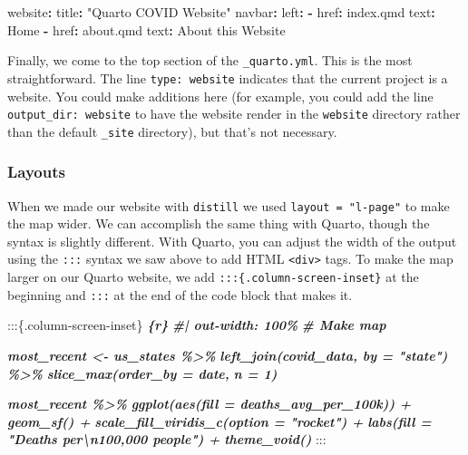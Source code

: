 \documentclass[
]{book}
\newenvironment{Shaded}{\begin{snugshade}}{\end{snugshade}}
\newcommand{\AttributeTok}[1]{\textcolor[rgb]{0.77,0.63,0.00}{#1}}
\newcommand{\FunctionTok}[1]{\textcolor[rgb]{0.00,0.00,0.00}{#1}}
\newcommand{\InformationTok}[1]{\textcolor[rgb]{0.56,0.35,0.01}{\textbf{\textit{#1}}}}
\newcommand{\KeywordTok}[1]{\textcolor[rgb]{0.13,0.29,0.53}{\textbf{#1}}}
\newcommand{\NormalTok}[1]{#1}
\newcommand{\StringTok}[1]{\textcolor[rgb]{0.31,0.60,0.02}{#1}}
\begin{document}
\begin{Shaded}
\begin{Highlighting}[]
\FunctionTok{website}\KeywordTok{:}
\AttributeTok{  }\FunctionTok{title}\KeywordTok{:}\AttributeTok{ }\StringTok{"Quarto COVID Website"}
\AttributeTok{  }\FunctionTok{navbar}\KeywordTok{:}
\AttributeTok{    }\FunctionTok{left}\KeywordTok{:}
\AttributeTok{      }\KeywordTok{{-}}\AttributeTok{ }\FunctionTok{href}\KeywordTok{:}\AttributeTok{ index.qmd}
\AttributeTok{        }\FunctionTok{text}\KeywordTok{:}\AttributeTok{ Home}
\AttributeTok{      }\KeywordTok{{-}}\AttributeTok{ }\FunctionTok{href}\KeywordTok{:}\AttributeTok{ about.qmd}
\AttributeTok{        }\FunctionTok{text}\KeywordTok{:}\AttributeTok{ About this Website}
\end{Highlighting}
\end{Shaded}

Finally, we come to the top section of the \texttt{\_quarto.yml}. This is the most straightforward. The line \texttt{type:\ website} indicates that the current project is a website. You could make additions here (for example, you could add the line \texttt{output\_dir:\ website} to have the website render in the \texttt{website} directory rather than the default \texttt{\_site} directory), but that's not necessary.

\hypertarget{layouts}{%
\subsubsection{Layouts}\label{layouts}}

When we made our website with \texttt{distill} we used \texttt{layout\ =\ "l-page"} to make the map wider. We can accomplish the same thing with Quarto, though the syntax is slightly different. With Quarto, you can adjust the width of the output using the \texttt{:::} syntax we saw above to add HTML \texttt{\textless{}div\textgreater{}} tags. To make the map larger on our Quarto website, we add \texttt{:::\{.column-screen-inset\}} at the beginning and \texttt{:::} at the end of the code block that makes it.

\begin{Shaded}
\begin{Highlighting}[]
\NormalTok{:::\{.column{-}screen{-}inset\}}
\InformationTok{\textasciigrave{}\textasciigrave{}\textasciigrave{}\{r\}}
\InformationTok{\#| out{-}width: 100\%}
\InformationTok{\# Make map}

\InformationTok{most\_recent \textless{}{-} us\_states \%\textgreater{}\% }
\InformationTok{  left\_join(covid\_data, by = "state") \%\textgreater{}\% }
\InformationTok{  slice\_max(order\_by = date,}
\InformationTok{            n = 1) }

\InformationTok{most\_recent \%\textgreater{}\% }
\InformationTok{  ggplot(aes(fill = deaths\_avg\_per\_100k)) +}
\InformationTok{  geom\_sf() +}
\InformationTok{  scale\_fill\_viridis\_c(option = "rocket") +}
\InformationTok{  labs(fill = "Deaths per\textbackslash{}n100,000 people") +}
\InformationTok{  theme\_void()}
\InformationTok{\textasciigrave{}\textasciigrave{}\textasciigrave{}}
\NormalTok{:::}
\end{Highlighting}
\end{Shaded}
\end{document}
